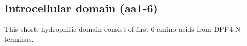 \subsection{Introcellular domain (aa1-6)}

This short, hydrophilic domain consist of first 6 amino acids from DPP4 N-terminus. 
